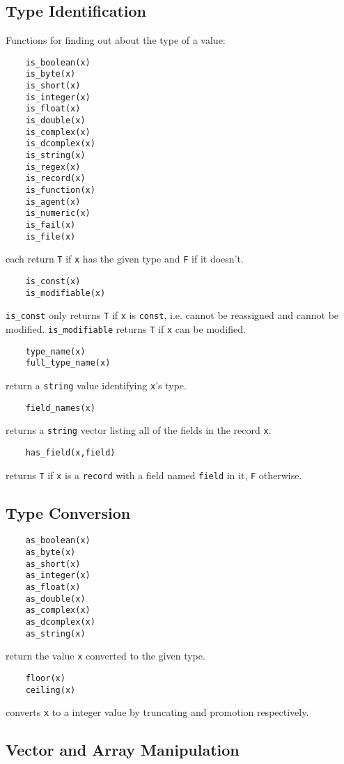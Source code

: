 \subsection{Type Identification}
Functions for finding out about the type of a value:
\begin{verbatim}
    is_boolean(x)
    is_byte(x)
    is_short(x)
    is_integer(x)
    is_float(x)
    is_double(x)
    is_complex(x)
    is_dcomplex(x)
    is_string(x)
    is_regex(x)
    is_record(x)
    is_function(x)
    is_agent(x)
    is_numeric(x)
    is_fail(x)
    is_file(x)
\end{verbatim}
each return {\tt T} if {\tt x} has the given type and {\tt F} if it doesn't.
\begin{verbatim}
    is_const(x)
    is_modifiable(x)
\end{verbatim}
{\tt is\_const} only returns {\tt T} if {\tt x} is {\tt const}, i.e. cannot be
reassigned and cannot be modified. {\tt is\_modifiable} returns {\tt T} if {\tt x}
can be modified.
\begin{verbatim}
    type_name(x)
    full_type_name(x)
\end{verbatim}
return a {\tt string} value identifying {\tt x}'s type.
\begin{verbatim}
    field_names(x)
\end{verbatim}
returns a {\tt string} vector listing all of the fields in the record {\tt x}.
\begin{verbatim}
    has_field(x,field)
\end{verbatim}
returns {\tt T} if {\tt x} is a {\tt record} with a field named {\tt field}
in it, {\tt F} otherwise.

\subsection{Type Conversion}

\begin{verbatim}
    as_boolean(x)
    as_byte(x)
    as_short(x)
    as_integer(x)
    as_float(x)
    as_double(x)
    as_complex(x)
    as_dcomplex(x)
    as_string(x)
\end{verbatim}
return the value {\tt x} converted to the given type.

\begin{verbatim}
    floor(x)
    ceiling(x)
\end{verbatim}
converts {\tt x} to a integer value by truncating and promotion respectively.

\subsection{Vector and Array Manipulation}

